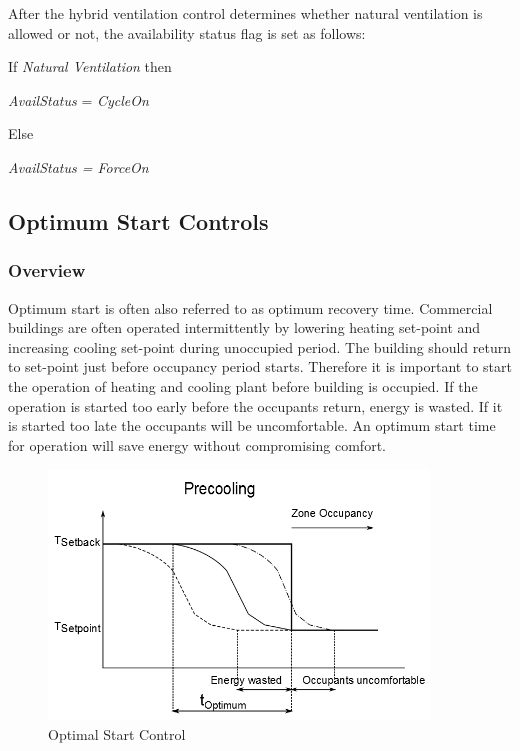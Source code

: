 After the hybrid ventilation control determines whether natural ventilation is allowed or not, the availability status flag is set as follows:

If \emph{Natural Ventilation} then

\emph{AvailStatus} = \emph{CycleOn}

Else

\emph{AvailStatus = ForceOn}

\subsection{Optimum Start Controls}\label{optimum-start-controls}

\subsubsection{Overview}\label{overview-1-008}

Optimum start is often also referred to as optimum recovery time. Commercial buildings are often operated intermittently by lowering heating set-point and increasing cooling set-point during unoccupied period. The building should return to set-point just before occupancy period starts. Therefore it is important to start the operation of heating and cooling plant before building is occupied. If the operation is started too early before the occupants return, energy is wasted. If it is started too late the occupants will be uncomfortable. An optimum start time for operation will save energy without compromising comfort.

\begin{figure}[hbtp] %
\centering
\includegraphics[width=0.9\textwidth, height=0.9\textheight, keepaspectratio=true]{media/image6731.png}
\caption{Optimal Start Control \protect \label{fig:optimal-start-control}}
\end{figure}

